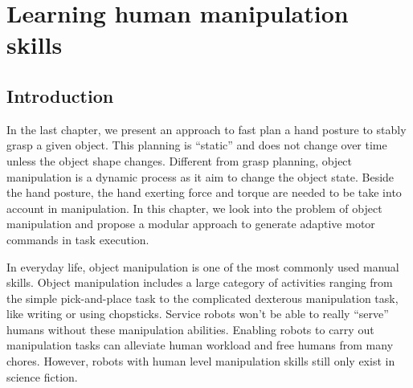 \chapter{Learning human manipulation skills}
\label{cha4}

\section{Introduction}
\label{cha4:sec1}
In the last chapter, we present an approach to fast plan a hand posture to stably grasp a given object. This planning is ``static'' and does not change over time unless the object shape changes. Different from grasp planning, object manipulation is a dynamic process as it aim to change the object state. Beside the hand posture, the hand exerting force and torque are needed to be take into account in manipulation. 
In this chapter, we look into the problem of object manipulation and propose a modular approach to generate adaptive motor commands in task execution.

In everyday life, object manipulation is one of the most
commonly used manual skills. Object manipulation includes a large category of activities ranging from the simple pick-and-place task to the complicated dexterous manipulation task, like writing or using chopsticks. Service robots won't be able to really ``serve'' humans without these manipulation abilities. Enabling robots to carry out manipulation tasks can alleviate human workload and free humans from many chores. However, robots with human level manipulation skills still only exist in science fiction.

